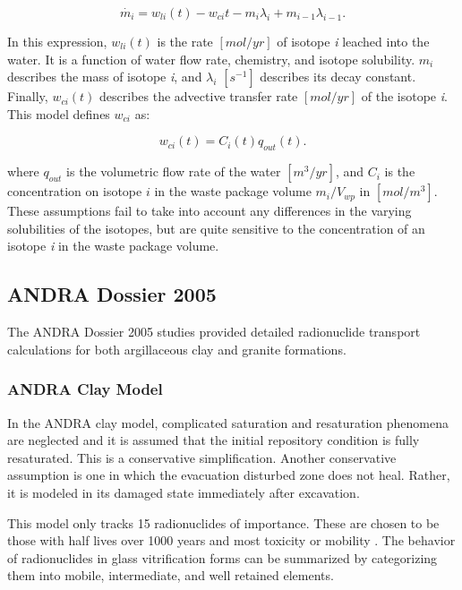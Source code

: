 {\begin{equation}
\dot{m_i}=w_{li}(t)-w_{ci}{t}-m_i\lambda_i+m_{i-1}\lambda_{i-1}.\nonumber
\end{equation}

In this expression, $w_{li}(t)$ is the rate $[mol/yr]$ of isotope \emph{i}
leached into the water.  It is a function of water flow rate, chemistry, and
isotope solubility. $m_i$ describes the mass of isotope \emph{i}, and
$\lambda_i$ $[s^{-1}]$ describes its decay constant. Finally, $w_{ci}(t)$
describes the advective transfer rate $[mol/yr]$ of the isotope \emph{i}. This 
model defines $w_{ci}$ as:

\begin{equation}
  w_{ci}(t)=C_i(t)q_{out}(t). 
\end{equation}

where $q_{out}$ is the volumetric flow rate of the water $[m^3/yr]$, and 
$C_i$ is the concentration on isotope $i$ in the waste package volume 
$m_i/V_{wp}$ in $[mol/m^3]$. These assumptions fail to take into account any
differences in the varying solubilities of the isotopes, but are quite
sensitive to the concentration of an isotope \emph{i} in the waste package
volume.  

\subsection{ANDRA Dossier 2005} The ANDRA Dossier 2005 studies provided
detailed radionuclide transport calculations for both argillaceous clay and granite
formations. 

\subsubsection{ANDRA Clay Model} 

In the \gls{ANDRA} clay model, complicated saturation and resaturation phenomena 
are neglected and it is assumed that the initial repository condition is fully
resaturated. This is a conservative simplification. Another conservative
assumption is one in which the evacuation disturbed zone does not heal. Rather,
it is modeled in its damaged state immediately after excavation. 

This model only tracks 15 radionuclides of importance.  These are chosen to be those
with half lives over 1000 years and most toxicity or mobility
\cite{andra_argile:_2005}. The behavior of radionuclides in 
glass vitrification forms can be summarized by categorizing them into mobile,
intermediate, and well retained elements. 

}
